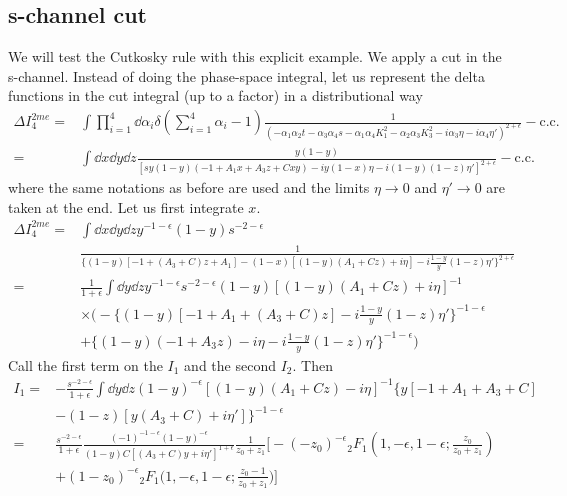 \subsection{s-channel cut}
We will test the Cutkosky rule with this explicit example. 
We apply a cut in the s-channel.
Instead of doing the phase-space integral, let us represent the delta functions in the cut integral (up to a factor) in a distributional way
\begin{equation}
\begin{split}
\Delta I_{4}^{2m e} = &
\int\prod_{i=1}^4 \dd \alpha_i \delta(\sum_{i=1}^4\alpha_i - 1)
\frac{1}{(-\alpha_1\alpha_2 t -\alpha_3\alpha_4 s- \alpha_1\alpha_4 K_1^2 - \alpha_2\alpha_3 K_3^2 - i\alpha_3\eta - i\alpha_4\eta')^{2+\epsilon}} 
- \mathrm{c.c.}
\\
 = &
\int\dd x \dd y \dd z
\frac{y(1-y)}{[sy(1-y)(-1 + A_1x + A_3 z + Cxy) - iy(1-x)\eta - i(1-y)(1-z)\eta']^{2+\epsilon}} -\mathrm{c.c.}
\end{split}
\end{equation}
where the same notations as before are used and the limits $\eta\rightarrow 0$ and $\eta'\rightarrow 0$ are taken at the end.
Let us first integrate \wrt $x$.
\begin{equation}
\begin{split}
\Delta I_4^{2me} = &
\int\dd x \dd y \dd z y^{-1-\epsilon}(1-y)s^{-2-\epsilon}
\\
&
\frac{1}{\big\{(1-y)[-1 + (A_3+C)z + A_1] - (1-x)[(1-y)(A_1 + Cz)  +i\eta]-i\frac{1-y}{y}(1-z)\eta'\big\}^{2+\epsilon}}
\\
= &
\frac{1}{1+\epsilon}
\int\dd y \dd z y^{-1-\epsilon}s^{-2-\epsilon}(1-y)[(1-y)(A_1 + Cz ) +i\eta]^{-1}
\\
& \times
\Big(-\{(1-y)[-1 + A_1 + (A_3 + C)z ] - i\frac{1-y}{y}(1-z)\eta'\}^{-1-\epsilon} 
\\
&
+\{(1-y)(-1 + A_3z) - i\eta - i\frac{1-y}{y}(1-z)\eta'\}^{-1-\epsilon}\Big)
\end{split}
\end{equation}
Call the first term on the \rhs $I_1$ and the second $I_2$. Then
\begin{equation}
\begin{split}
I_1 = &
-\frac{s^{-2-\epsilon}}{1+\epsilon}\int\dd y \dd z (1-y)^{-\epsilon}[(1-y)(A_1 + Cz) - i\eta]^{-1}
\{y[-1 + A_1 + A_3 + C ] 
\\
& - (1-z)[y(A_3 + C) + i\eta']\}^{-1-\epsilon}
\\
= &
\frac{s^{-2-\epsilon}}{1+\epsilon}\frac{(-1)^{-1-\epsilon}(1-y)^{-\epsilon}}{(1-y )C[(A_3+C)y + i\eta']^{1+\epsilon}}
\frac{1}{z_0 + z_1}\Big[-(-z_0)^{-\epsilon}{}_2F_1(1,-\epsilon, 1-\epsilon; \frac{z_0}{z_0 + z_1})
\\
& + (1-z_0)^{-\epsilon}{}_2F_1\big(1,-\epsilon, 1-\epsilon; \frac{z_0 -1 }{z_0+z_1}\big)\Big]
\end{split}
\end{equation}
